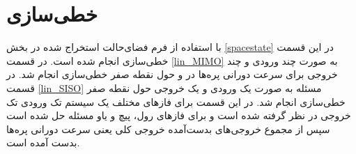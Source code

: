 \section{خطی‌سازی}
با استفاده از فرم فضای‌حالت استخراج شده در بخش 
\ref{spacestate}
در این قسمت خطی‌سازی انجام شده ‌است. در قسمت 
\ref{lin_MIMO}
به صورت چند ورودی و چند خروجی
 برای سرعت دورانی پره‌ها در  
و حول نقطه صفر خطی‌سازی انجام شد. در قسمت \ref{lin_SISO} مسئله به صورت یک ورودی و یک خروجی 
حول نقطه صفر خطی‌سازی انجام شد. در این قسمت برای فازهای مختلف یک سیستم تک ورودی تک خروجی در نظر گرفته ‌شده ‌است و برای فازهای رول، پیچ و یاو مسئله حل شده است  سپس از مجموع خروجی‌های بدست‌آمده خروجی کلی یعنی سرعت دورانی پره‌ها بدست ‌آمده است.